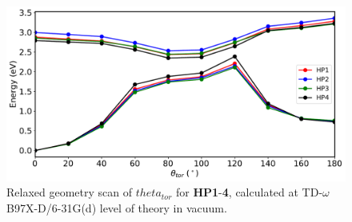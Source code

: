 \begin{figure}[t]
\centering
  \includegraphics[width=0.9\linewidth]{5ConnectingCrystalStructure/2HP_scan_vac.pdf}
  \caption[Relaxed geometry scan of $theta_{tor}$ for \textbf{HP} derivatives]{Relaxed geometry scan of $theta_{tor}$ for \textbf{HP1}-\textbf{4}, calculated at TD-$\omega$B97X-D/6-31G(d) level of theory in vacuum.}
  \label{figure: HP_scan_vac}
\end{figure}

